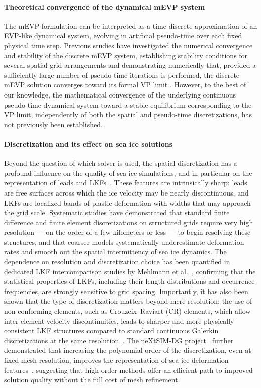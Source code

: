 \documentclass[11pt]{article}
\begin{document}
\paragraph{Theoretical convergence of the dynamical mEVP system}
The mEVP formulation can be interpreted as a time-discrete approximation of an EVP-like dynamical system, evolving in artificial pseudo-time over each fixed physical time step. Previous studies have investigated the numerical convergence and stability of the discrete mEVP system, establishing stability conditions for several spatial grid arrangements and demonstrating numerically that, provided a sufficiently large number of pseudo-time iterations is performed, the discrete mEVP solution converges toward its formal VP limit \cite{kimmritz2015convergence,Kimmritz2016}. However, to the best of our knowledge, the mathematical convergence of the underlying continuous pseudo-time dynamical system toward a stable equilibrium corresponding to the VP limit, independently of both the spatial and pseudo-time discretizations, has not previously been established.

\paragraph{Discretization and its effect on sea ice solutions}
Beyond the question of which solver is used, the spatial discretization has a profound influence on the quality of sea ice simulations, and in particular on the representation of leads and LKFs~\cite{MehlmannLKF2021}. These features are intrinsically sharp: leads are free surfaces across which the ice velocity may be nearly discontinuous, and LKFs are localized bands of plastic deformation with widths that may approach the grid scale. Systematic studies have demonstrated that standard finite difference and finite element discretizations on structured grids require very high resolution — on the order of a few kilometers or less — to begin resolving these structures, and that coarser models systematically underestimate deformation rates and smooth out the spatial intermittency of sea ice dynamics. The dependence on resolution and discretization choice has been quantified in dedicated LKF intercomparison studies by Mehlmann et al.~\cite{MehlmannLKF2021}, confirming that the statistical properties of LKFs, including their length distributions and occurrence frequencies, are strongly sensitive to grid spacing. Importantly, it has also been shown that the type of discretization matters beyond mere resolution: the use of non-conforming elements, such as Crouzeix–Raviart (CR) elements, which allow inter-element velocity discontinuities, leads to sharper and more physically consistent LKF structures compared to standard continuous Galerkin discretizations at the same resolution~\cite{Mehlmann2021}. The neXtSIM-DG project~\cite{nextsimdg} further demonstrated that increasing the polynomial order of the discretization, even at fixed mesh resolution, improves the representation of sea ice deformation features~\cite{richter2023dynamical}, suggesting that high-order methods offer an efficient path to improved solution quality without the full cost of mesh refinement.
\end{document}
